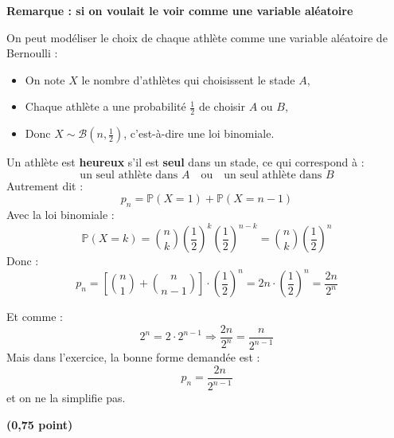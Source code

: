 \documentclass[12pt,a4paper]{article}
\begin{document}
\begin{enumerate}
          \vspace{0.4cm}
          \noindent

          \textbf{Remarque : si on voulait le voir comme une variable aléatoire}

          \vspace{0.2cm}
          On peut modéliser le choix de chaque athlète comme une variable aléatoire de Bernoulli :
          \begin{itemize}
              \item On note \( X \) le nombre d’athlètes qui choisissent le stade \( A \),
              \item Chaque athlète a une probabilité \( \frac{1}{2} \) de choisir \( A \) ou \( B \),
              \item Donc \( X \sim \mathcal{B}(n, \frac{1}{2}) \), c’est-à-dire une loi binomiale.
          \end{itemize}

          Un athlète est \textbf{heureux} s’il est \textbf{seul} dans un stade, ce qui correspond à :
          \[
              \text{un seul athlète dans } A \quad \text{ou} \quad \text{un seul athlète dans } B
          \]
          Autrement dit :
          \[
              p_n = \mathbb{P}(X = 1) + \mathbb{P}(X = n - 1)
          \]
          Avec la loi binomiale :
          \[
              \mathbb{P}(X = k) = \binom{n}{k} \left( \frac{1}{2} \right)^k \left( \frac{1}{2} \right)^{n - k} = \binom{n}{k} \left( \frac{1}{2} \right)^n
          \]
          Donc :
          \[
              p_n = \left[ \binom{n}{1} + \binom{n}{n - 1} \right] \cdot \left( \frac{1}{2} \right)^n = 2n \cdot \left( \frac{1}{2} \right)^n = \frac{2n}{2^n}
          \]

          Et comme :
          \[
              2^n = 2 \cdot 2^{n - 1} \Rightarrow \frac{2n}{2^n} = \frac{n}{2^{n - 1}}
          \]
          Mais dans l'exercice, la bonne forme demandée est :
          \[
              \boxed{p_n = \frac{2n}{2^{n - 1}}}
          \]
          et on ne la simplifie pas.


          \begin{center}
               \hfill \textbf{(0,75 point)}
          \end{center}
\end{enumerate}
\end{document}

